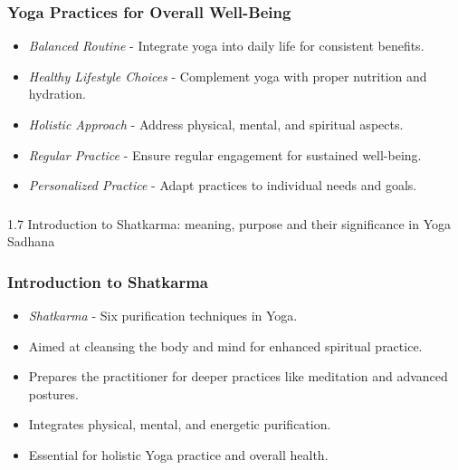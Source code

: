 \begin{frame}[fragile]\frametitle{Yoga Practices for Overall Well-Being}

      \begin{itemize}
		\item \textit{Balanced Routine} - Integrate yoga into daily life for consistent benefits.
		\item \textit{Healthy Lifestyle Choices} - Complement yoga with proper nutrition and hydration.
		\item \textit{Holistic Approach} - Address physical, mental, and spiritual aspects.
		\item \textit{Regular Practice} - Ensure regular engagement for sustained well-being.
		\item \textit{Personalized Practice} - Adapt practices to individual needs and goals.
	  \end{itemize}

\end{frame}



\begin{frame}[fragile]\frametitle{}
\begin{center}
{\Large 1.7 Introduction to Shatkarma: meaning, purpose and their significance in Yoga Sadhana}
\end{center}
\end{frame}

\begin{frame}[fragile]\frametitle{Introduction to Shatkarma}

      \begin{itemize}
		\item \textit{Shatkarma} - Six purification techniques in Yoga.
		\item Aimed at cleansing the body and mind for enhanced spiritual practice.
		\item Prepares the practitioner for deeper practices like meditation and advanced postures.
		\item Integrates physical, mental, and energetic purification.
		\item Essential for holistic Yoga practice and overall health.
	  \end{itemize}

\end{frame}

